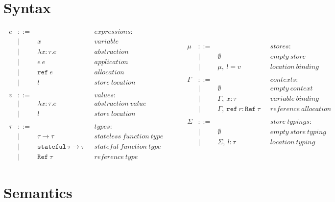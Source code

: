 \documentclass{llncs}
\newcommand{\reftt}{\mathtt{ref}~}
\newcommand{\Reftt}{\mathtt{Ref}~}
\newcommand{\stateful}{\mathtt{stateful}~}
\begin{document}
\section{Syntax}

\[
\begin{array}{lll}
\begin{array}{lllr}
e & ::= & & expressions \colon\\
& | & x & variable\\
& | & \lambda x : \tau . e & abstraction\\
& | & e~e & application\\
& | & \reftt e & allocation\\
& | & l & store~location\\
&&&\\
v & ::= & & values \colon\\
& | & \lambda x : \tau . e & abstraction~value\\
& | & l & store~location\\
&&&\\
\tau & ::= & & types \colon\\
& | & \tau \rightarrow \tau & stateless~function~type\\
& | & \stateful \tau \rightarrow \tau~~~& stateful~function~type\\
& | & \Reftt \tau & reference~type
\end{array}
& ~~~~~
&
\begin{array}{lllr}
\mu & ::= & & stores \colon\\
& | & \emptyset & empty~store\\
& | & \mu,~l = v & location~binding\\
&&&\\
\Gamma & ::= & & contexts \colon\\
& | & \emptyset & empty~context\\
& | & \Gamma,~x : \tau & variable~binding\\
& | & \Gamma,~\reftt r : \Reftt \tau~~~& reference~allocation\\
&&&\\
\Sigma & ::= & & store~typings \colon\\
& | & \emptyset & empty~store~typing\\
& | & \Sigma,~l : \tau & location~typing
\end{array}
\end{array}
\]


\section{Semantics}
\end{document}
